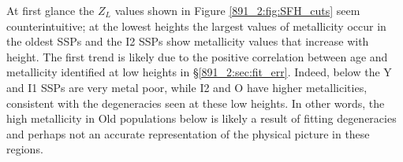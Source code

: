 

At first glance the $Z_L$ values shown in Figure \ref{891_2:fig:SFH_cuts}
seem counterintuitive; at the lowest heights the largest values of
metallicity occur in the oldest SSPs and the I2 SSPs show metallicity
values that increase with height. The first trend is likely due to the
positive correlation between age and metallicity identified at low
heights in \S\ref{891_2:sec:fit_err}. Indeed, below  the Y and
I1 SSPs are very metal poor, while I2 and O have higher metallicities,
consistent with the degeneracies seen at these low heights. In other
words, the high metallicity in Old populations below  is
likely a result of fitting degeneracies and perhaps not an accurate
representation of the physical picture in these regions.


